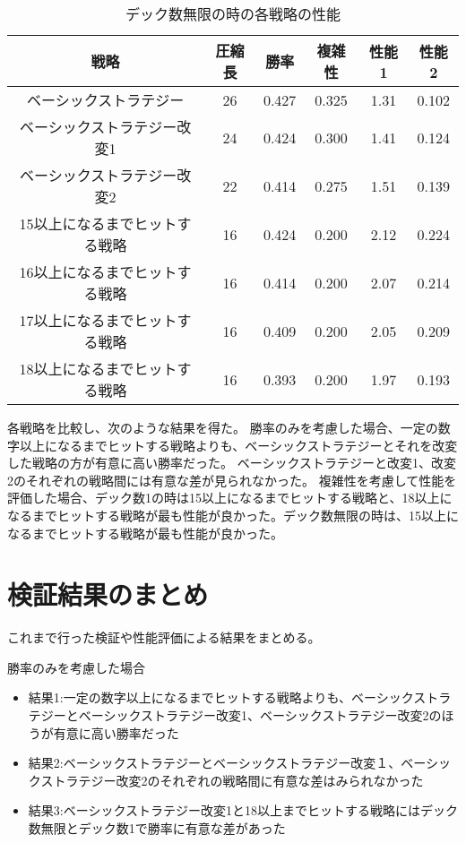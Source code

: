 \begin{table}[H]
\caption{デック数無限の時の各戦略の性能}
\label{table:data_type5}
\begin{center}
\begin{tabular}{|c|c|c|c|c|c|}
\hline
戦略           & 圧縮長 & 勝率    & 複雑性   & 性能1  & 性能2   \\ \hline
ベーシックストラテジー         & 26  & 0.427 & 0.325 & 1.31 & 0.102 \\ \hline
ベーシックストラテジー改変1      & 24  & 0.424 & 0.300  & 1.41 & 0.124 \\ \hline
ベーシックストラテジー改変2      & 22  & 0.414 & 0.275 & 1.51 & 0.139 \\ \hline
15以上になるまでヒットする戦略 & 16  & 0.424 & 0.200 & 2.12 & 0.224 \\ \hline
16以上になるまでヒットする戦略 & 16  & 0.414 & 0.200 & 2.07 & 0.214 \\ \hline
17以上になるまでヒットする戦略 & 16  & 0.409 & 0.200 & 2.05 & 0.209 \\ \hline
18以上になるまでヒットする戦略 & 16  & 0.393 & 0.200 & 1.97 & 0.193 \\ \hline
\end{tabular}
\end{center}
\end{table}

各戦略を比較し、次のような結果を得た。
勝率のみを考慮した場合、一定の数字以上になるまでヒットする戦略よりも、ベーシックストラテジーとそれを改変した戦略の方が有意に高い勝率だった。
ベーシックストラテジーと改変1、改変2のそれぞれの戦略間には有意な差が見られなかった。
複雑性を考慮して性能を評価した場合、デック数1の時は15以上になるまでヒットする戦略と、18以上になるまでヒットする戦略が最も性能が良かった。デック数無限の時は、15以上になるまでヒットする戦略が最も性能が良かった。



\section{検証結果のまとめ}
これまで行った検証や性能評価による結果をまとめる。

勝率のみを考慮した場合
\begin{itemize}
\item 結果1:一定の数字以上になるまでヒットする戦略よりも、ベーシックストラテジーとベーシックストラテジー改変1、ベーシックストラテジー改変2のほうが有意に高い勝率だった
\item 結果2:ベーシックストラテジーとベーシックストラテジー改変１、ベーシックストラテジー改変2のそれぞれの戦略間に有意な差はみられなかった
\item 結果3:ベーシックストラテジー改変1と18以上までヒットする戦略にはデック数無限とデック数1で勝率に有意な差があった
\end{itemize}

